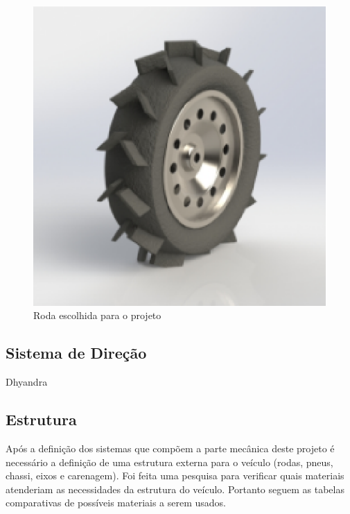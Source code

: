   \begin{figure}[!htbp]
  \begin{center}
  \includegraphics[keepaspectratio=true,scale=0.5]{figuras/wheel.eps}
  \caption{\label{WHEEL}Roda escolhida para o projeto}
  \end{center}
  \end{figure}

  \newpage
  \vfill
  \pagebreak

  \subsection{Sistema de Direção}
    Dhyandra
      
  \subsection{Estrutura}
  Após a definição dos sistemas que compõem a parte mecânica deste projeto é necessário a definição de uma estrutura externa para o veículo (rodas, pneus, chassi, eixos e carenagem). Foi feita uma pesquisa para verificar quais materiais atenderiam as necessidades da estrutura do veículo. Portanto seguem as tabelas comparativas de possíveis materiais a serem usados.

